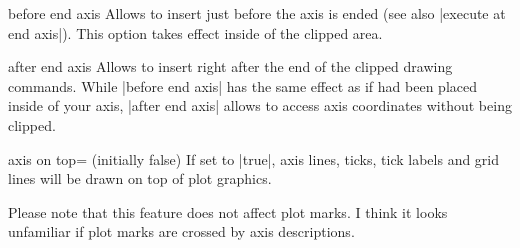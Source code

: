 \begin{pgfplotscodekey}{before end axis}
Allows to insert  just before the axis is ended (see also |execute at end axis|). This option takes effect inside of the clipped area.
\begin{codeexample}[]
\end{codeexample}
\end{pgfplotscodekey}

\begin{pgfplotscodekey}{after end axis}
Allows to insert  right after the end of the clipped drawing commands. While |before end axis| has the same effect as if  had been placed inside of your axis, |after end axis| allows to access axis coordinates without being clipped.
\begin{codeexample}[]
\end{codeexample}
\end{pgfplotscodekey}


\begin{pgfplotskey}{axis on top= (initially false)}
	If set to |true|, axis lines, ticks, tick labels and grid lines will be drawn on top of plot graphics.
\begin{codeexample}[]
\end{codeexample}

\begin{codeexample}[]
\end{codeexample}
Please note that this feature does not affect plot marks. I think it looks unfamiliar if plot marks are crossed by axis descriptions.
\end{pgfplotskey}


